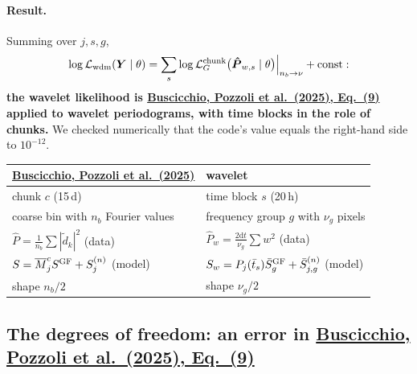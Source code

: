 \documentclass[11pt,a4paper]{article}
\newcommand{\urlPone}{https://arxiv.org/pdf/2511.03604}
\newcommand{\Pone}{\href{\urlPone}{Buscicchio, Pozzoli et al.~(2025)}}
\newcommand{\PoneEq}[1]{\href{\urlPone}{Buscicchio, Pozzoli et al.~(2025), Eq.~(#1)}}
\newcommand{\dd}{\mathrm{d}}
\newcommand{\Pbar}{\hat{P}}
\newcommand{\Mbar}{\overline{M}}
\begin{document}
\paragraph{Result.} Summing over $j,s,g$,
\begin{equation}
  \log\mathcal L_{\rm wdm}(\boldsymbol Y\mid\theta) = \sum_s
  \log\mathcal L^{\rm chunk}_G\big(\boldsymbol{\Pbar}_{w,s}\mid\theta\big)\Big|_{n_{b}\to\nu}
  + \text{const}:
\end{equation}
\textbf{the wavelet likelihood is \PoneEq{9} applied to wavelet periodograms, with time
blocks in the role of chunks.} We checked numerically that the code's value equals the
right-hand side to $10^{-12}$.
\begin{center}
\renewcommand{\arraystretch}{1.2}
\begin{tabular}{@{}ll@{}}
\toprule
\Pone & wavelet \\
\midrule
chunk $c$ (15\,d) & time block $s$ (20\,h) \\
coarse bin with $n_b$ Fourier values & frequency group $g$ with $\nu_g$ pixels \\
$\Pbar=\frac{1}{n_b}\sum|\tilde d_k|^2$ (data) & $\Pbar_w=\frac{2\dd t}{\nu_g}\sum w^2$ (data) \\
$S=\Mbar^c_jS^{\rm GF}+S^{(n)}_j$ (model) & $S_w=P_j(\bar t_s)\bar S^{\rm GF}_g+\bar S^{(n)}_{j,g}$ (model) \\
shape $n_b/2$ & shape $\nu_g/2$ \\
\bottomrule
\end{tabular}
\end{center}

\subsection[The degrees of freedom: an error in Eq.~(9)]{The degrees of freedom: an error in \PoneEq{9}}\label{sec:dofbug}
\end{document}
